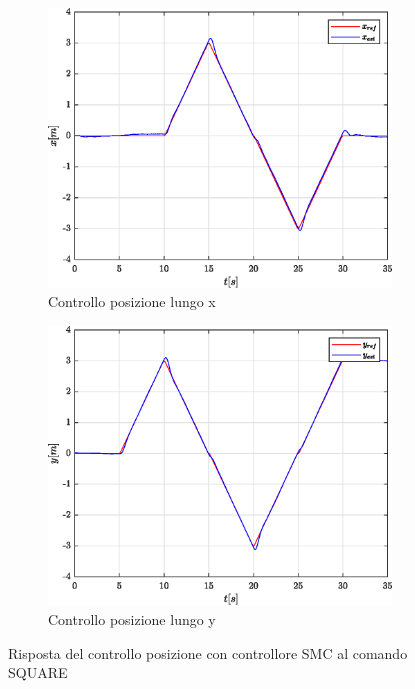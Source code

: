 \begin{figure}
	\centering
	\begin{subfigure}{0.45\textwidth}
		\centering
		\includegraphics[width=1\textwidth]{Simulazioni/Figure/SMC/SQUARE/PositionControlXPos}
		\caption{Controllo posizione lungo x}
		\label{fig:SQUAREerrposxSMC}
	\end{subfigure}
	\hfill
	\begin{subfigure}{0.45\textwidth}
		\centering
		\includegraphics[width=1\textwidth]{Simulazioni/Figure/SMC/SQUARE/PositionControlYPos}
		\caption{Controllo posizione lungo y}
		\label{fig:SQUAREerrposySMC}
	\end{subfigure}
	\caption{Risposta del controllo posizione con controllore SMC al comando SQUARE}
\end{figure}

